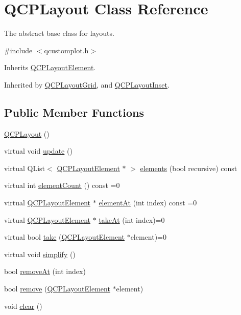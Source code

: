 \hypertarget{class_q_c_p_layout}{\section{Q\-C\-P\-Layout Class Reference}
\label{class_q_c_p_layout}
}


The abstract base class for layouts.  




{\ttfamily \#include $<$qcustomplot.\-h$>$}



Inherits \hyperlink{class_q_c_p_layout_element}{Q\-C\-P\-Layout\-Element}.



Inherited by \hyperlink{class_q_c_p_layout_grid}{Q\-C\-P\-Layout\-Grid}, and \hyperlink{class_q_c_p_layout_inset}{Q\-C\-P\-Layout\-Inset}.

\subsection*{Public Member Functions}
\begin{DoxyCompactItemize}
\item 
\hyperlink{class_q_c_p_layout_a04222e6e1361fd802d48f1a25b7020d4}{Q\-C\-P\-Layout} ()
\item 
virtual void \hyperlink{class_q_c_p_layout_a91321049c2e37e372abd118095f65b87}{update} ()
\item 
virtual Q\-List$<$ \hyperlink{class_q_c_p_layout_element}{Q\-C\-P\-Layout\-Element} $\ast$ $>$ \hyperlink{class_q_c_p_layout_a51fe2675b53e829130b229bc1f7b0f99}{elements} (bool recursive) const 
\item 
virtual int \hyperlink{class_q_c_p_layout_a39d3e9ef5d9b82ab1885ba1cb9597e56}{element\-Count} () const =0
\item 
virtual \hyperlink{class_q_c_p_layout_element}{Q\-C\-P\-Layout\-Element} $\ast$ \hyperlink{class_q_c_p_layout_afa73ca7d859f8a3ee5c73c9b353d2a56}{element\-At} (int index) const =0
\item 
virtual \hyperlink{class_q_c_p_layout_element}{Q\-C\-P\-Layout\-Element} $\ast$ \hyperlink{class_q_c_p_layout_a5a79621fa0a6eabb8b520cfc04fb601a}{take\-At} (int index)=0
\item 
virtual bool \hyperlink{class_q_c_p_layout_ada26cd17e56472b0b4d7fbbc96873e4c}{take} (\hyperlink{class_q_c_p_layout_element}{Q\-C\-P\-Layout\-Element} $\ast$element)=0
\item 
virtual void \hyperlink{class_q_c_p_layout_a41e6ac049143866e8f8b4964efab01b2}{simplify} ()
\item 
bool \hyperlink{class_q_c_p_layout_a2403f684fee3ce47132faaeed00bb066}{remove\-At} (int index)
\item 
bool \hyperlink{class_q_c_p_layout_a6c58f537d8086f352576ab7c5b15d0bc}{remove} (\hyperlink{class_q_c_p_layout_element}{Q\-C\-P\-Layout\-Element} $\ast$element)
\item 
void \hyperlink{class_q_c_p_layout_a02883bdf2769b5b227f0232dba1ac4ee}{clear} ()
\end{DoxyCompactItemize}
